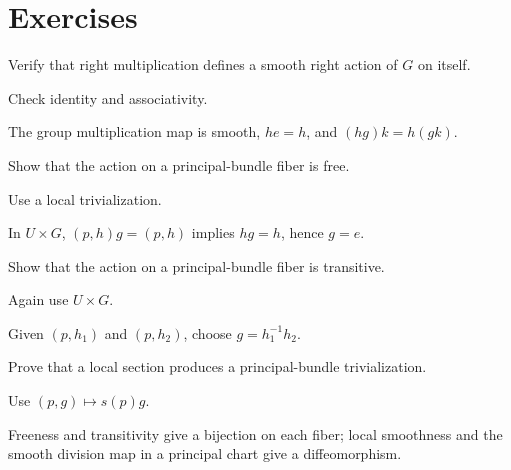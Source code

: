 \section{Exercises}

\begin{exercise}\label{exr:vii08-01}
Verify that right multiplication defines a smooth right action of \(G\) on itself.
\end{exercise}
\begin{hint}
Check identity and associativity.
\end{hint}
\begin{solution}
The group multiplication map is smooth, \(h e=h\), and \((hg)k=h(gk)\).
\end{solution}

\begin{exercise}\label{exr:vii08-02}
Show that the action on a principal-bundle fiber is free.
\end{exercise}
\begin{hint}
Use a local trivialization.
\end{hint}
\begin{solution}
In \(U\times G\), \((p,h)g=(p,h)\) implies \(hg=h\), hence \(g=e\).
\end{solution}

\begin{exercise}\label{exr:vii08-03}
Show that the action on a principal-bundle fiber is transitive.
\end{exercise}
\begin{hint}
Again use \(U\times G\).
\end{hint}
\begin{solution}
Given \((p,h_1)\) and \((p,h_2)\), choose \(g=h_1^{-1}h_2\).
\end{solution}

\begin{exercise}\label{exr:vii08-04}
Prove that a local section produces a principal-bundle trivialization.
\end{exercise}
\begin{hint}
Use \((p,g)\mapsto s(p)g\).
\end{hint}
\begin{solution}
Freeness and transitivity give a bijection on each fiber; local smoothness and the smooth division map in a principal chart give a diffeomorphism.
\end{solution}

